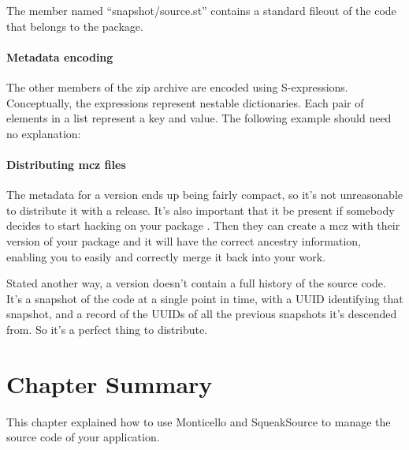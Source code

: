 \documentclass[a4paper,10pt,twoside]{book}
\begin{document}
The member named ``snapshot/source.st'' contains a standard fileout of the code that belongs to the package.

\paragraph{Metadata encoding}

The other members of the zip archive are encoded using S-expressions. Conceptually, the expressions represent nestable dictionaries. Each pair of elements in a list represent a key and value. The following example should need no explanation: 


\paragraph{Distributing mcz files}

The metadata for a version ends up being fairly compact, so it's not unreasonable to distribute it with a release.  It's also important that it be present if somebody decides to start hacking on your package . Then they can create a mcz with their version of your package and it will have the correct ancestry information, enabling you to easily and correctly merge it back into your work.

Stated another way, a version doesn't contain a full history of the source code. It's a snapshot of the code at a single point in time, with a UUID identifying that snapshot, and a record of the UUIDs of all the previous snapshots it's descended from. So it's a perfect thing to distribute. 

\section{Chapter Summary}

This chapter explained how to use Monticello and SqueakSource to manage the source code of your application.
\end{document}
